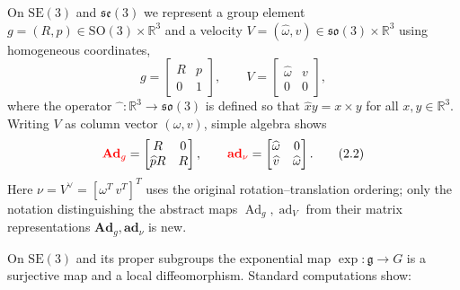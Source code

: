 \documentclass[11pt]{article}
\newcommand{\rev}[1]{\textcolor{red}{#1}}
\newenvironment{revision}{\color{red}}{}
\newcommand{\bAd}{\mathbf{Ad}}
\newcommand{\bad}{\mathbf{ad}}
\newcommand{\SO}{\mathrm{SO}}
\newcommand{\SE}{\mathrm{SE}}
\newcommand{\so}{\mathfrak{so}}
\newcommand{\se}{\mathfrak{se}}
\newcommand{\gfrak}{\mathfrak g}
\newcommand{\Ad}{\operatorname{Ad}}
\newcommand{\ad}{\operatorname{ad}}
\newcommand{\R}{\mathbb R}
\begin{document}
On $\SE(3)$ and $\se(3)$ we represent a group element $g=(R,p)\in\SO(3)\times\R^3$ and a velocity $V=(\widehat\omega,v)\in\so(3)\times\R^3$ using homogeneous coordinates,
\begin{equation*}
g=\begin{bmatrix}R&p\\0&1\end{bmatrix},\qquad
V=\begin{bmatrix}\widehat\omega&v\\0&0\end{bmatrix},
\end{equation*}
where the operator $\widehat{\phantom{x}}:\R^3\to\so(3)$ is defined so that $\widehat x y=x\times y$ for all $x,y\in\R^3$. Writing $V$ as column vector $(\omega,v)$, simple algebra shows
\begin{equation*}
\rev{\bAd_g}=\begin{bmatrix}R&0\\\widehat pR&R\end{bmatrix},\qquad
\rev{\bad_\nu}=\begin{bmatrix}\widehat\omega&0\\\widehat v&\widehat\omega\end{bmatrix}.\tag{2.2}\label{eq:2.2}
\end{equation*}
\begin{revision}
Here $\nu=V^\vee=[\omega^T\ v^T]^T$ uses the original rotation--translation ordering; only the notation distinguishing the abstract maps $\Ad_g,\ad_V$ from their matrix representations $\bAd_g,\bad_\nu$ is new.
\end{revision}

On $\SE(3)$ and its proper subgroups the exponential map $\exp:\gfrak\to G$ is a surjective map and a local diffeomorphism. Standard computations show:
\end{document}
